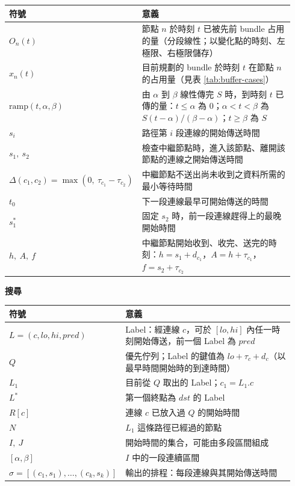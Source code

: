 \noindent\begin{tabular}{p{0.34\linewidth}p{0.6\linewidth}}
\hline
符號 & 意義 \\
\hline
$O_n(t)$ & 節點 $n$ 於時刻 $t$ 已被先前 bundle 占用的量（分段線性；以變化點的時刻、左極限、右極限儲存） \\
$x_n(t)$ & 目前規劃的 bundle 於時刻 $t$ 在節點 $n$ 的占用量（見表 \ref{tab:buffer-cases}） \\
$\mathrm{ramp}(t,\alpha,\beta)$ & 由 $\alpha$ 到 $\beta$ 線性傳完 $S$ 時，到時刻 $t$ 已傳的量：$t\le\alpha$ 為 $0$；$\alpha<t<\beta$ 為 $S(t-\alpha)/(\beta-\alpha)$；$t\ge\beta$ 為 $S$ \\
$s_i$ & 路徑第 $i$ 段連線的開始傳送時間 \\
$s_1,\ s_2$ & 檢查中繼節點時，進入該節點、離開該節點的連線之開始傳送時間 \\
$\Delta(c_1,c_2)=\max(0,\ \tau_{c_1}-\tau_{c_2})$ & 中繼節點不送出尚未收到之資料所需的最小等待時間 \\
$t_0$ & 下一段連線最早可開始傳送的時間 \\
$s_1^\ast$ & 固定 $s_2$ 時，前一段連線趕得上的最晚開始時間 \\
$h,\ A,\ f$ & 中繼節點開始收到、收完、送完的時刻：$h=s_1+d_{c_1}$，$A=h+\tau_{c_1}$，$f=s_2+\tau_{c_2}$ \\
\hline
\end{tabular}

\medskip
\noindent\textbf{搜尋}

\noindent\begin{tabular}{p{0.34\linewidth}p{0.6\linewidth}}
\hline
符號 & 意義 \\
\hline
$L=(c, \mathit{lo}, \mathit{hi}, \mathit{pred})$ & Label：經連線 $c$，可於 $[\mathit{lo},\mathit{hi}]$ 內任一時刻開始傳送，前一個 Label 為 $\mathit{pred}$ \\
$Q$ & 優先佇列；Label 的鍵值為 $\mathit{lo}+\tau_c+d_c$（以最早時間開始時的到達時間） \\
$L_1$ & 目前從 $Q$ 取出的 Label；$c_1 = L_1.c$ \\
$L^\ast$ & 第一個終點為 $\mathit{dst}$ 的 Label \\
$R[c]$ & 連線 $c$ 已放入過 $Q$ 的開始時間 \\
$N$ & $L_1$ 這條路徑已經過的節點 \\
$I,\ J$ & 開始時間的集合，可能由多段區間組成 \\
$[\alpha,\beta]$ & $I$ 中的一段連續區間 \\
$\sigma=[(c_1,s_1),\dots,(c_k,s_k)]$ & 輸出的排程：每段連線與其開始傳送時間 \\
\hline
\end{tabular}


